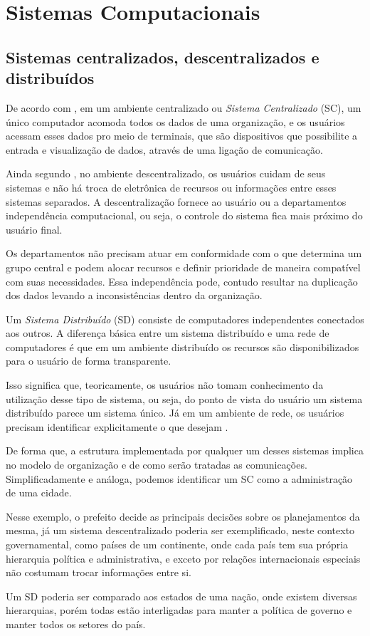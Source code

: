 \chapter{Sistemas Computacionais}\label{Estruturas}
%
\section{Sistemas centralizados, descentralizados e distribuídos}
\par
De acordo com \cite{GAL03}, em um ambiente centralizado ou \emph{Sistema Centralizado} (SC), um único computador acomoda todos os dados de uma organização, e os usuários acessam esses dados pro meio de terminais, que são dispositivos que possibilite a entrada e visualização de dados, através de uma ligação de comunicação. 
\par
Ainda segundo \cite{GAL03}, no ambiente descentralizado, os usuários cuidam de seus sistemas e não há troca de eletrônica de recursos ou informações entre esses sistemas separados. A descentralização fornece ao usuário ou a departamentos independência computacional, ou seja, o controle do sistema fica mais próximo do usuário final.
\par
 Os departamentos não precisam atuar em conformidade com o que determina um grupo central e podem alocar recursos e definir prioridade de maneira compatível com suas necessidades. Essa independência pode, contudo resultar na duplicação dos dados levando a inconsistências dentro da organização.
\par
Um \emph{Sistema Distribuído} (SD) consiste de computadores independentes conectados aos outros. A diferença básica entre um sistema distribuído e uma rede de computadores é que em um ambiente distribuído os recursos são disponibilizados para o usuário de forma transparente. 
\par
Isso significa que, teoricamente, os usuários não tomam conhecimento da utilização desse tipo de sistema, ou seja, do ponto de vista do usuário um sistema distribuído parece um sistema único. Já em um ambiente de rede, os usuários precisam identificar explicitamente o que desejam \citep{GAL03}.
\par
De forma que, a estrutura implementada por qualquer um desses sistemas implica no modelo de organização e de como serão tratadas as comunicações. Simplificadamente e análoga, podemos identificar um SC como a administração de uma cidade. 
\par 
Nesse exemplo, o prefeito decide as principais decisões sobre os planejamentos da mesma, já um sistema descentralizado poderia ser exemplificado, neste contexto governamental, como países de um continente, onde cada país tem sua própria hierarquia política e administrativa, e exceto por relações internacionais especiais não costumam trocar informações entre si. 
\par
Um SD poderia ser comparado aos estados de uma nação, onde existem diversas hierarquias, porém todas estão interligadas para manter a política de governo e manter todos os setores do país.

